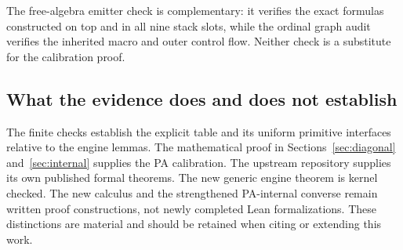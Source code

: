 The free-algebra emitter check is complementary: it verifies the exact formulas constructed on top and in all nine stack slots, while the ordinal graph audit verifies the inherited macro and outer control flow. Neither check is a substitute for the calibration proof.

\subsection{What the evidence does and does not establish}
The finite checks establish the explicit table and its uniform primitive interfaces relative to the engine lemmas. The mathematical proof in Sections~\ref{sec:diagonal} and~\ref{sec:internal} supplies the PA calibration. The upstream repository supplies its own published formal theorems. The new generic engine theorem is kernel checked. The new calculus and the strengthened PA-internal converse remain written proof constructions, not newly completed Lean formalizations. These distinctions are material and should be retained when citing or extending this work.
